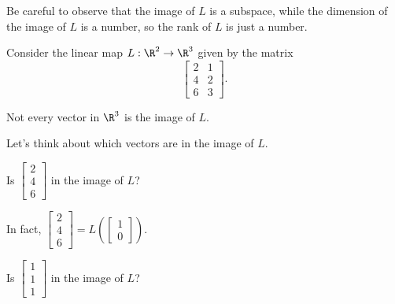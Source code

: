 \documentclass{ximera}
\begin{document}
Be careful to observe that the image of $L$ is a subspace, while the dimension of the image of $L$
is a number, so the rank of $L$ is just a number.

\begin{question}
  Consider the linear map $L : \R^2 \to \R^3$ given by the matrix
  $$
  \begin{bmatrix}
    2 & 1 \\
    4 & 2 \\
    6 & 3
  \end{bmatrix}.
  $$
  
  \begin{solution}
    \begin{hint}
      Not every vector in $\R^3$ is the image of $L$.
    \end{hint}

    \begin{hint}
      Let's think about which vectors are in the image of $L$.

      \begin{question}
        Is $\begin{bmatrix} 2 \\ 4 \\ 6 \end{bmatrix}$ in the image of $L$?

        \begin{solution}
          \begin{multiple-choice}
          \end{multiple-choice}
        \end{solution}

        In fact, $\begin{bmatrix} 2 \\ 4 \\ 6 \end{bmatrix} = L \left( \begin{bmatrix} 1 \\ 0 \end{bmatrix} \right)$.

        Is $\begin{bmatrix} 1 \\ 1 \\ 1 \end{bmatrix}$ in the image of $L$?

        \begin{solution}
          \begin{multiple-choice}
          \end{multiple-choice}
        \end{solution}


\end{question}
\end{hint}
\end{solution}
\end{question}
\end{document}
